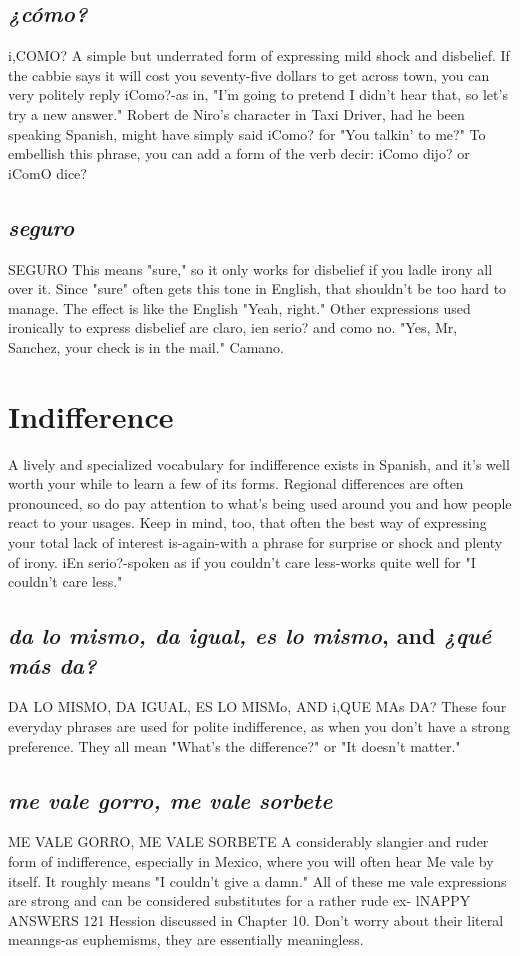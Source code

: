 \subsection{\emph{¿cómo?}}
i,COMO?
A simple but underrated form of expressing mild shock and
disbelief. If the cabbie says it will cost you seventy-five dollars to get
across town, you can very politely reply iComo?-as in, "I'm going to
pretend I didn't hear that, so let's try a new answer." Robert de Niro's
character in Taxi Driver, had he been speaking Spanish, might have
simply said iComo? for "You talkin' to me?" To embellish this phrase,
you can add a form of the verb decir: iComo dijo? or iComO dice?
\subsection{\emph{seguro}}
SEGURO
This means "sure," so it only works for disbelief if you ladle
irony all over it. Since "sure" often gets this tone in English, that
shouldn't be too hard to manage. The effect is like the English "Yeah,
right." Other expressions used ironically to express disbelief are claro,
ien serio? and como no. "Yes, Mr, Sanchez, your check is in the mail."
Camano.
\section{Indifference}
A lively and specialized vocabulary for indifference exists in
Spanish, and it's well worth your while to learn a few of its forms. Regional differences are often pronounced, so do pay attention to what's
being used around you and how people react to your usages. Keep in
mind, too, that often the best way of expressing your total lack of interest is-again-with a phrase for surprise or shock and plenty of
irony. iEn serio?-spoken as if you couldn't care less-works quite
well for "I couldn't care less."
\subsection{\emph{da lo mismo, da igual, es lo mismo}, and \emph{¿qué más da?}}
DA LO MISMO, DA IGUAL, ES LO MISMo, AND
i,QUE MAs DA?
These four everyday phrases are used for polite indifference, as
when you don't have a strong preference. They all mean "What's the
difference?" or "It doesn't matter."
\subsection{\emph{me vale gorro, me vale sorbete}}
ME VALE GORRO, ME VALE SORBETE
A considerably slangier and ruder form of indifference, especially in Mexico, where you will often hear Me vale by itself. It
roughly means "I couldn't give a damn." All of these me vale expressions are strong and can be considered substitutes for a rather rude ex-
lNAPPY ANSWERS 121
Hession discussed in Chapter 10. Don't worry about their literal meanngs-as euphemisms, they are essentially meaningless.
